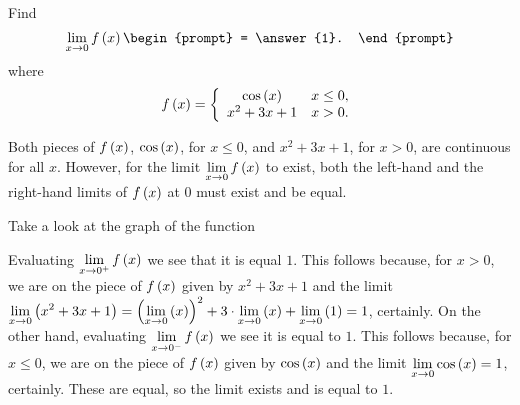 \documentclass{ximera}
\author{Gregory Hartman \and Matthew Carr}
\begin{document}
\begin{exercise}



  Find 
  \[
  \lim_{x\to 0} f\p{x}
  \begin{prompt}
  = \answer{1}.
  \end{prompt}
  \]
  where
  \[
  f\left(x\right) = \left\{\begin{array}{cl} \cos\left(x\right) & x\leq 0, \\ x^2+3x+1 & x>0. \end{array}\right.
  \]
    \begin{hint}
     Both pieces of $f\left(x\right)$, $\cos\left(x\right)$, for $x\leq0$, and $x^2+3x+1$, for $x>0$, are continuous for all $x$. However, for the limit $\lim_{x\to0}f\p{x}$ to exist, both the left-hand and the right-hand limits of $f\left(x\right)$ at $0$ must exist and be equal.
    \end{hint}
     \begin{hint}
    	Take a look at the graph of the function
    \begin{center}
      \end{center} 
    \end{hint}
    \begin{hint}
     Evaluating $\lim_{x\to0^{+}}f\p{x}$ we see that it is equal $1$. This follows because, for $x>0$, we are on the piece of $f\left(x\right)$ given by $x^2+3x+1$ and the limit $\lim_{x\to0}\p{x^2+3x+1}=\p{\lim_{x\to0}\p{x}}^2+3\cdot\lim_{x\to0}\p{x}+\lim_{x\to0}\p{1}=1$, certainly. On the other hand, evaluating $\lim_{x\to0^{-}}f\p{x}$ we see it is equal to $1$. This follows because, for $x\leq0$, we are on the piece of $f\left(x\right)$ given by $\cos\left(x\right)$ and the limit $\lim_{x\to0}\cos\p{x}=1$, certainly. These are equal, so the limit exists and is equal to $1$.
    \end{hint}
\end{exercise}
\end{document}
